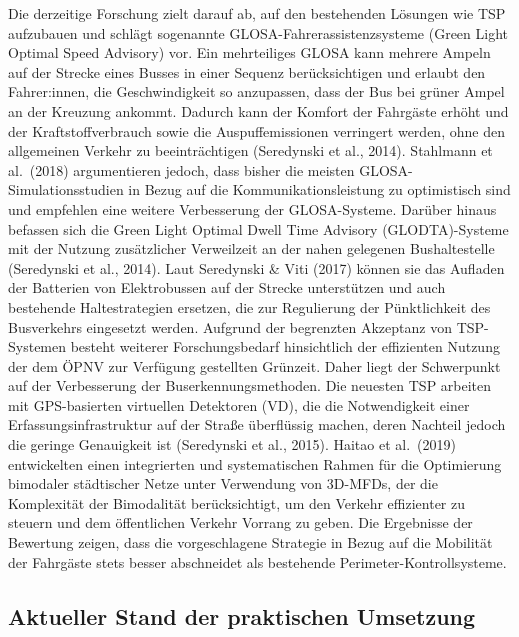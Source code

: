 \documentclass[
]{book}
\begin{document}
Die derzeitige Forschung zielt darauf ab, auf den bestehenden Lösungen wie TSP aufzubauen und schlägt sogenannte GLOSA-Fahrerassistenzsysteme (Green Light Optimal Speed Advisory) vor. Ein mehrteiliges GLOSA kann mehrere Ampeln auf der Strecke eines Busses in einer Sequenz berücksichtigen und erlaubt den Fahrer:innen, die Geschwindigkeit so anzupassen, dass der Bus bei grüner Ampel an der Kreuzung ankommt. Dadurch kann der Komfort der Fahrgäste erhöht und der Kraftstoffverbrauch sowie die Auspuffemissionen verringert werden, ohne den allgemeinen Verkehr zu beeinträchtigen (Seredynski et al., 2014). Stahlmann et al.~(2018) argumentieren jedoch, dass bisher die meisten GLOSA-Simulationsstudien in Bezug auf die Kommunikationsleistung zu optimistisch sind und empfehlen eine weitere Verbesserung der GLOSA-Systeme.
Darüber hinaus befassen sich die Green Light Optimal Dwell Time Advisory (GLODTA)-Systeme mit der Nutzung zusätzlicher Verweilzeit an der nahen gelegenen Bushaltestelle (Seredynski et al., 2014). Laut Seredynski \& Viti (2017) können sie das Aufladen der Batterien von Elektrobussen auf der Strecke unterstützen und auch bestehende Haltestrategien ersetzen, die zur Regulierung der Pünktlichkeit des Busverkehrs eingesetzt werden.
Aufgrund der begrenzten Akzeptanz von TSP-Systemen besteht weiterer Forschungsbedarf hinsichtlich der effizienten Nutzung der dem ÖPNV zur Verfügung gestellten Grünzeit. Daher liegt der Schwerpunkt auf der Verbesserung der Buserkennungsmethoden. Die neuesten TSP arbeiten mit GPS-basierten virtuellen Detektoren (VD), die die Notwendigkeit einer Erfassungsinfrastruktur auf der Straße überflüssig machen, deren Nachteil jedoch die geringe Genauigkeit ist (Seredynski et al., 2015).
Haitao et al.~(2019) entwickelten einen integrierten und systematischen Rahmen für die Optimierung bimodaler städtischer Netze unter Verwendung von 3D-MFDs, der die Komplexität der Bimodalität berücksichtigt, um den Verkehr effizienter zu steuern und dem öffentlichen Verkehr Vorrang zu geben. Die Ergebnisse der Bewertung zeigen, dass die vorgeschlagene Strategie in Bezug auf die Mobilität der Fahrgäste stets besser abschneidet als bestehende Perimeter-Kontrollsysteme.

\hypertarget{aktueller-stand-der-praktischen-umsetzung-5}{%
\subsection*{Aktueller Stand der praktischen Umsetzung}\label{aktueller-stand-der-praktischen-umsetzung-5}}
\end{document}
